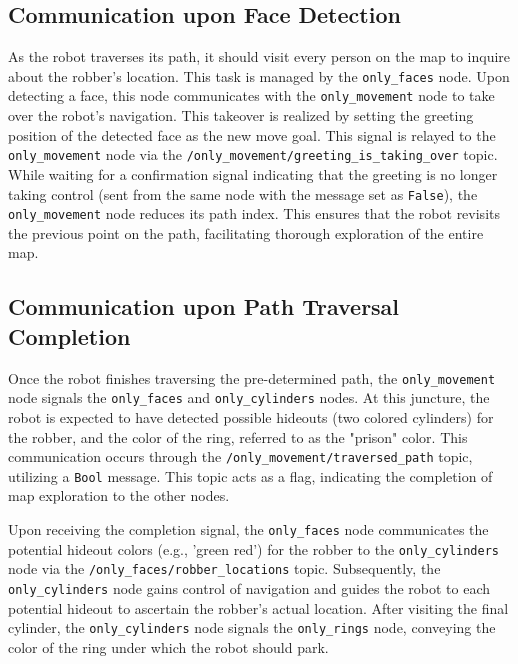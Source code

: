 \documentclass{article}
\begin{document}
\subsection{Communication upon Face Detection}

As the robot traverses its path, it should visit every person on the map to inquire about the robber's location. This task is managed by the \texttt{only\_faces} node. Upon detecting a face, this node communicates with the \texttt{only\_movement} node to take over the robot's navigation. This takeover is realized by setting the greeting position of the detected face as the new move goal. This signal is relayed to the \texttt{only\_movement} node via the \texttt{/only\_movement/greeting\_is\_taking\_over} topic. While waiting for a confirmation signal indicating that the greeting is no longer taking control (sent from the same node with the message set as \texttt{False}), the \texttt{only\_movement} node reduces its path index. This ensures that the robot revisits the previous point on the path, facilitating thorough exploration of the entire map.

\subsection{Communication upon Path Traversal Completion}

Once the robot finishes traversing the pre-determined path, the \texttt{only\_movement} node signals the \texttt{only\_faces} and \texttt{only\_cylinders} nodes. At this juncture, the robot is expected to have detected possible hideouts (two colored cylinders) for the robber, and the color of the ring, referred to as the "prison" color. This communication occurs through the \texttt{/only\_movement/traversed\_path} topic, utilizing a \texttt{Bool} message. This topic acts as a flag, indicating the completion of map exploration to the other nodes.

Upon receiving the completion signal, the \texttt{only\_faces} node communicates the potential hideout colors (e.g., 'green red') for the robber to the \texttt{only\_cylinders} node via the \texttt{/only\_faces/robber\_locations} topic. Subsequently, the \texttt{only\_cylinders} node gains control of navigation and guides the robot to each potential hideout to ascertain the robber's actual location. After visiting the final cylinder, the \texttt{only\_cylinders} node signals the \texttt{only\_rings} node, conveying the color of the ring under which the robot should park.
\end{document}
